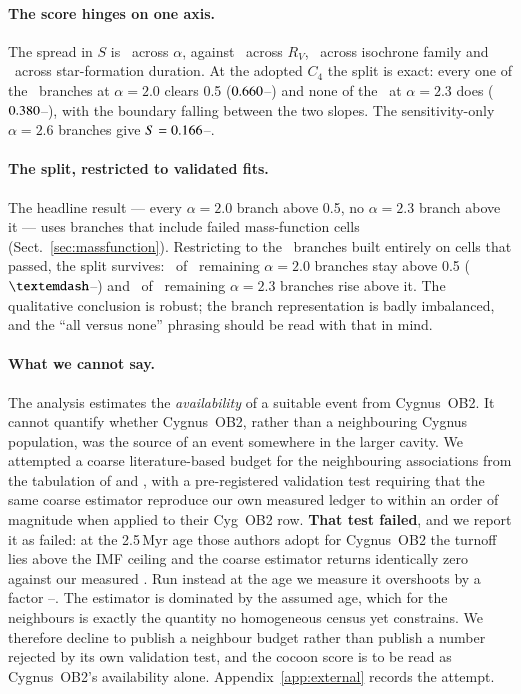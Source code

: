 \documentclass{aa}
\begin{document}
\paragraph{The score hinges on one axis.}
The spread in $S$ is \spreadAlpha\ across $\alpha$, against \spreadRv\ across
$R_V$, \spreadFamily\ across isochrone family and \spreadDelta\ across
star-formation duration. At the adopted $C_4$ the split is exact: every one of
the \PverdictTwon\ branches at $\alpha = 2.0$ clears 0.5
($0.660$--\PverdictTwohi) and none of the \PverdictTwoThreen\ at
$\alpha = 2.3$ does ($0.380$--\PverdictTwoThreehi), with the
boundary falling between the two slopes. The sensitivity-only $\alpha = 2.6$
branches give $S = 0.166$--\Pverdictsixhi.

\paragraph{The split, restricted to validated fits.}
The headline result --- every $\alpha = 2.0$ branch above 0.5, no $\alpha = 2.3$
branch above it --- uses branches that include failed mass-function cells
(Sect.~\ref{sec:massfunction}). Restricting to the \gateStrictBranches\ branches
built entirely on cells that passed, the split survives: \strictTwoAbove\ of
\strictTwon\ remaining $\alpha = 2.0$ branches stay above 0.5
($\strictTwolo$--\strictTwohi) and \strictTwoThreeAbove\ of \strictTwoThreen\
remaining $\alpha = 2.3$ branches rise above it. The qualitative conclusion is
robust; the branch representation is badly imbalanced, and the ``all versus
none'' phrasing should be read with that in mind.

\paragraph{What we cannot say.}
The analysis estimates the \emph{availability} of a suitable event from
Cygnus~OB2. It cannot quantify whether Cygnus~OB2, rather than a neighbouring
Cygnus population, was the source of an event somewhere in the larger cavity. We
attempted a coarse literature-based budget for the neighbouring associations
from the tabulation of \citet{martin2010} and \citet{knodlseder2002}, with a
pre-registered validation test requiring that the same coarse estimator reproduce our own
measured ledger to within an order of magnitude when applied to their Cyg~OB2
row. \textbf{That test failed}, and we report it as failed: at the 2.5\,Myr age
those authors adopt for Cygnus~OB2 the turnoff lies above the IMF ceiling and
the coarse estimator returns identically zero against our measured \NSN. Run
instead at the age we measure it overshoots by a factor
\coarseRatioLo--\coarseRatioHi. The estimator is dominated by the assumed age,
which for the neighbours is exactly the quantity no homogeneous census yet
constrains. We therefore decline to publish a neighbour budget rather than
publish a number rejected by its own validation test, and the cocoon score is to be read as
Cygnus~OB2's availability alone. Appendix~\ref{app:external} records the
attempt.
\end{document}
